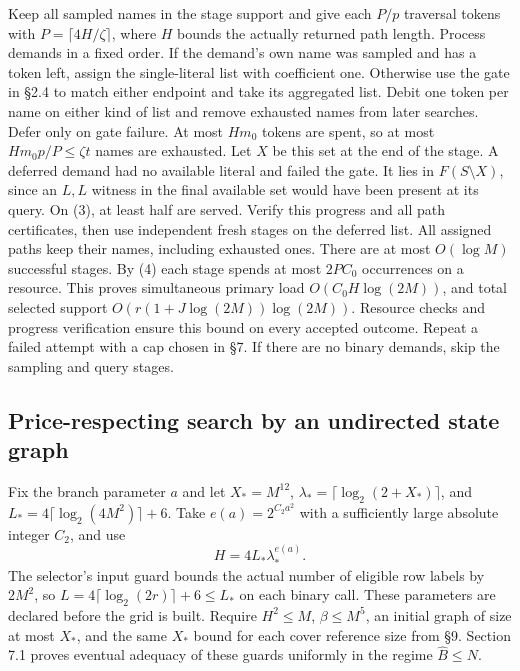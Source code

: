 \documentclass[11pt]{article}
\begin{document}
Keep all sampled names in the stage support and give each \(P/p\) traversal tokens with \(P=\lceil4H/\zeta\rceil\), where \(H\) bounds the actually returned path length. Process demands in a fixed order. If the demand's own name was sampled and has a token left, assign the single-literal list with coefficient one. Otherwise use the gate in §2.4 to match either endpoint and take its aggregated list. Debit one token per name on either kind of list and remove exhausted names from later searches. Defer only on gate failure. At most \(Hm_0\) tokens are spent, so at most \(Hm_0p/P\le\zeta t\) names are exhausted. Let \(X\) be this set at the end of the stage. A deferred demand had no available literal and failed the gate. It lies in \(F(S\setminus X)\), since an \(L,L\) witness in the final available set would have been present at its query. On (3), at least half are served. Verify this progress and all path certificates, then use independent fresh stages on the deferred list. All assigned paths keep their names, including exhausted ones. There are at most \(O(\log M)\) successful stages. By (4) each stage spends at most \(2P C_0\) occurrences on a resource. This proves simultaneous primary load \(O(C_0 H\log(2M))\), and total selected support \(O(r(1+J\log(2M))\log(2M))\). Resource checks and progress verification ensure this bound on every accepted outcome. Repeat a failed attempt with a cap chosen in §7. If there are no binary demands, skip the sampling and query stages.

\hypertarget{price-respecting-search-by-an-undirected-state-graph}{%
\subsection{Price-respecting search by an undirected state graph}\label{price-respecting-search-by-an-undirected-state-graph}}

Fix the branch parameter \(a\) and let \(X_*=M^{12}\), \(\lambda_*=\lceil\log_2(2+X_*)\rceil\), and \(L_*=4\lceil\log_2(4M^2)\rceil+6\). Take \(e(a)=2^{C_2a^2}\) with a sufficiently large absolute integer \(C_2\), and use
\[
          H=4L_*\lambda_*^{e(a)} .
\]
The selector's input guard bounds the actual number of eligible row labels by \(2M^2\), so \(L=4\lceil\log_2(2r)\rceil+6\le L_*\) on each binary call. These parameters are declared before the grid is built. Require \(H^2\le M\), \(\beta\le M^5\), an initial graph of size at most \(X_*\), and the same \(X_*\) bound for each cover reference size from §9. Section 7.1 proves eventual adequacy of these guards uniformly in the regime \(\widehat B\le N\).
\end{document}
